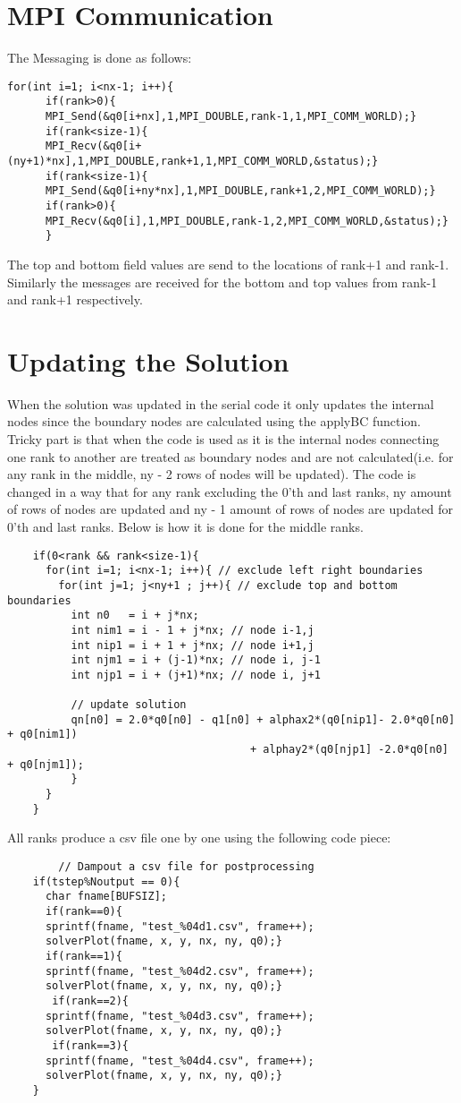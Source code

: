 \documentclass{article}
\begin{document}
\section{MPI Communication}
The Messaging is done as follows:
\begin{verbatim}
for(int i=1; i<nx-1; i++){
      if(rank>0){
      MPI_Send(&q0[i+nx],1,MPI_DOUBLE,rank-1,1,MPI_COMM_WORLD);}
      if(rank<size-1){
      MPI_Recv(&q0[i+(ny+1)*nx],1,MPI_DOUBLE,rank+1,1,MPI_COMM_WORLD,&status);}
      if(rank<size-1){
      MPI_Send(&q0[i+ny*nx],1,MPI_DOUBLE,rank+1,2,MPI_COMM_WORLD);}
      if(rank>0){
      MPI_Recv(&q0[i],1,MPI_DOUBLE,rank-1,2,MPI_COMM_WORLD,&status);}
      }
\end{verbatim}
The top and bottom field values are send to the locations of rank+1 and rank-1. Similarly the messages are received for the bottom and top values from rank-1 and rank+1 respectively.
\section{Updating the Solution}
When the solution was updated in the serial code it only updates the internal nodes since the boundary nodes are calculated using the applyBC function. Tricky part is that when the code is used as it is the internal nodes connecting one rank to another are treated as boundary nodes and are not calculated(i.e. for any rank in the middle, ny - 2 rows of nodes will be updated). The code is changed in a way that for any rank excluding the 0'th and last ranks, ny amount of rows of nodes are updated and ny - 1 amount of rows of nodes are updated for 0'th and last ranks. Below is how it is done for the middle ranks.
\begin{verbatim}
    if(0<rank && rank<size-1){
      for(int i=1; i<nx-1; i++){ // exclude left right boundaries
        for(int j=1; j<ny+1 ; j++){ // exclude top and bottom boundaries
          int n0   = i + j*nx; 
          int nim1 = i - 1 + j*nx; // node i-1,j
          int nip1 = i + 1 + j*nx; // node i+1,j
          int njm1 = i + (j-1)*nx; // node i, j-1
          int njp1 = i + (j+1)*nx; // node i, j+1
            
          // update solution 
          qn[n0] = 2.0*q0[n0] - q1[n0] + alphax2*(q0[nip1]- 2.0*q0[n0] + q0[nim1])
                                      + alphay2*(q0[njp1] -2.0*q0[n0] + q0[njm1]); 
          }
      }
    }
\end{verbatim}
All ranks produce a csv file one by one using the following code piece:
\begin{verbatim}
        // Dampout a csv file for postprocessing
    if(tstep%Noutput == 0){ 
      char fname[BUFSIZ];
      if(rank==0){
      sprintf(fname, "test_%04d1.csv", frame++);
      solverPlot(fname, x, y, nx, ny, q0);}
      if(rank==1){
      sprintf(fname, "test_%04d2.csv", frame++);
      solverPlot(fname, x, y, nx, ny, q0);}
       if(rank==2){
      sprintf(fname, "test_%04d3.csv", frame++);
      solverPlot(fname, x, y, nx, ny, q0);}
       if(rank==3){
      sprintf(fname, "test_%04d4.csv", frame++);
      solverPlot(fname, x, y, nx, ny, q0);}
    }
\end{verbatim}
\end{document}
